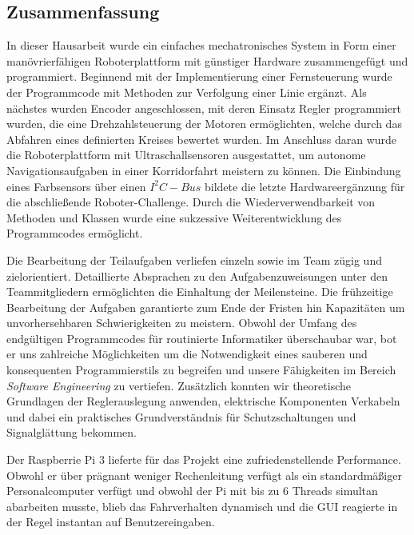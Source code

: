 \documentclass[12pt,a4paper,oneside]{article}
\begin{document}
\begin{spacing}{1.15}
	\section{Zusammenfassung}
	In dieser Hausarbeit wurde ein einfaches mechatronisches System in Form einer manövrierfähigen Roboterplattform mit günstiger Hardware zusammengefügt und programmiert. Beginnend mit der Implementierung einer Fernsteuerung wurde der Programmcode mit Methoden zur Verfolgung einer Linie ergänzt. Als nächstes wurden Encoder angeschlossen, mit deren Einsatz Regler programmiert wurden, die eine Drehzahlsteuerung der Motoren ermöglichten, welche durch das Abfahren eines definierten Kreises bewertet wurden. Im Anschluss daran wurde die Roboterplattform mit Ultraschallsensoren ausgestattet, um autonome Navigationsaufgaben in einer Korridorfahrt meistern zu können. Die Einbindung eines Farbsensors über einen $I^{2}C-Bus$ bildete die letzte Hardwareergänzung für die abschließende Roboter-Challenge. Durch die Wiederverwendbarkeit von Methoden und Klassen wurde eine sukzessive Weiterentwicklung des Programmcodes ermöglicht.
	
	Die Bearbeitung der Teilaufgaben verliefen einzeln sowie im Team zügig und zielorientiert. Detaillierte Absprachen zu den Aufgabenzuweisungen unter den Teammitgliedern ermöglichten die Einhaltung der Meilensteine. Die frühzeitige Bearbeitung der Aufgaben garantierte zum Ende der Fristen hin Kapazitäten um unvorhersehbaren Schwierigkeiten zu meistern. Obwohl der Umfang des endgültigen Programmcodes für routinierte Informatiker überschaubar war, bot er uns zahlreiche Möglichkeiten um die Notwendigkeit eines sauberen und konsequenten Programmierstils zu begreifen und unsere Fähigkeiten im Bereich \textit{Software Engineering} zu vertiefen. Zusätzlich konnten wir theoretische Grundlagen der Reglerauslegung anwenden, elektrische Komponenten Verkabeln und dabei ein praktisches Grundverständnis für Schutzschaltungen und Signalglättung bekommen. 
	
	
	Der Raspberrie Pi 3 lieferte für das Projekt eine zufriedenstellende Performance. Obwohl er über prägnant weniger Rechenleitung verfügt als ein standardmäßiger Personalcomputer verfügt und obwohl der Pi mit bis zu 6 Threads simultan abarbeiten musste, blieb das Fahrverhalten dynamisch und die GUI reagierte in der Regel instantan auf Benutzereingaben.    
	
	\clearpage
	\begin{appendix}

\end{appendix}
\end{spacing}
\end{document}
